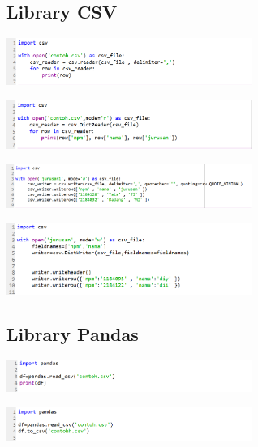 \documentclass{article}
\begin{document}
\subsection{Library CSV}
\begin{center}
    \includegraphics[width=8cm]{figure/1.png}
\end{center}

\begin{center}
    \includegraphics[width=8cm]{figure/2.png}
\end{center}

\begin{center}
    \includegraphics[width=8cm]{figure/3.png}
\end{center}

\begin{center}
    \includegraphics[width=8cm]{figure/4.png}
\end{center}

\subsection{Library Pandas}
\begin{center}
    \includegraphics[width=8cm]{figure/pandas1.png}
\end{center}

\begin{center}
    \includegraphics[width=8cm]{figure/pandas2.png}
\end{center}\\
\end{document}
